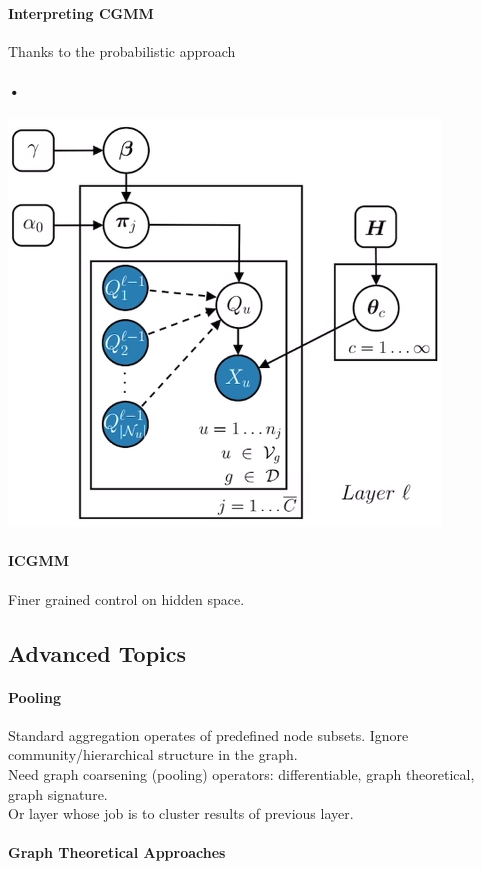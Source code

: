 \documentclass[10pt]{report}
\begin{document}
\paragraph{Interpreting CGMM} Thanks to the probabilistic approach
\paragraph{•} \begin{center}
	\includegraphics[scale=0.5]{205.png}
\end{center}
\paragraph{ICGMM} Finer grained control on hidden space.
\subsection{Advanced Topics}
\paragraph{Pooling} Standard aggregation operates of predefined node subsets. Ignore community/hierarchical structure in the graph.\\
Need graph coarsening (pooling) operators: differentiable, graph theoretical, graph signature.\\
Or layer whose job is to cluster results of previous layer.
\paragraph{Graph Theoretical Approaches} 
\end{document}
